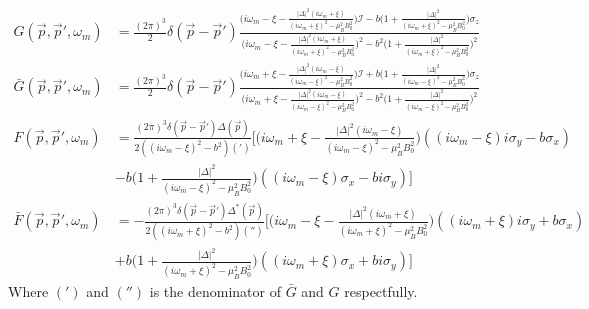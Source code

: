 \documentclass{article}
\begin{document}
\begin{align*}
G(\vec{p},\vec{p}',\omega_m)&=\frac{(2\pi)^3}{2}\delta(\vec{p}-\vec{p}')\frac{\bigg(i\omega_m-\xi-\frac{|\Delta|^2(i\omega_m+\xi)}{(i\omega_m+\xi)^2-\mu_B^2B_0^2}\bigg)\mathcal{I}-b\bigg(1+\frac{|\Delta|^2}{(i\omega_m+\xi)^2-\mu_B^2B_0^2}\bigg)\sigma_z}{\bigg(i\omega_m-\xi-\frac{|\Delta|^2(i\omega_m+\xi)}{(i\omega_m+\xi)^2-\mu_B^2B_0^2}\bigg)^2-b^2\bigg(1+\frac{|\Delta|^2}{(i\omega_m+\xi)^2-\mu_B^2B_0^2}\bigg)^2} \\ \bar{G}(\vec{p},\vec{p}',\omega_m)&=\frac{(2\pi)^3}{2}\delta(\vec{p}-\vec{p}')\frac{\bigg(i\omega_m+\xi-\frac{|\Delta|^2(i\omega_m-\xi)}{(i\omega_m-\xi)^2-\mu_B^2B_0^2}\bigg)\mathcal{I}+b\bigg(1+\frac{|\Delta|^2}{(i\omega_m-\xi)^2-\mu_B^2B_0^2}\bigg)\sigma_z}{\bigg(i\omega_m+\xi-\frac{|\Delta|^2(i\omega_m-\xi)}{(i\omega_m-\xi)^2-\mu_B^2B_0^2}\bigg)^2-b^2\bigg(1+\frac{|\Delta|^2}{(i\omega_m-\xi)^2-\mu_B^2B_0^2}\bigg)^2} \\ F(\vec{p},\vec{p}',\omega_m)&=\frac{(2\pi)^3\delta(\vec{p}-\vec{p}')\Delta(\vec{p})}{2((i\omega_m-\xi)^2-b^2)(')}\bigg[\bigg(i\omega_m+\xi-\frac{|\Delta|^2(i\omega_m-\xi)}{(i\omega_m-\xi)^2-\mu_B^2B_0^2}\bigg)((i\omega_m-\xi)i\sigma_y-b\sigma_x) \\ &-b\bigg(1+\frac{|\Delta|^2}{(i\omega_m-\xi)^2-\mu_B^2B_0^2}\bigg)((i\omega_m-\xi)\sigma_x-bi\sigma_y)\bigg] \\ \bar{F}(\vec{p},\vec{p}',\omega_m)&=-\frac{(2\pi)^3\delta(\vec{p}-\vec{p}')\Delta^*(\vec{p})}{2((i\omega_m+\xi)^2-b^2)('')}\bigg[\bigg(i\omega_m-\xi-\frac{|\Delta|^2(i\omega_m+\xi)}{(i\omega_m+\xi)^2-\mu_B^2B_0^2}\bigg)((i\omega_m+\xi)i\sigma_y+b\sigma_x) \\ &+b\bigg(1+\frac{|\Delta|^2}{(i\omega_m+\xi)^2-\mu_B^2B_0^2}\bigg)((i\omega_m+\xi)\sigma_x+bi\sigma_y)\bigg]
\end{align*}
Where $(')$ and $('')$ is the denominator of $\bar{G}$ and $G$ respectfully.
\end{document}
